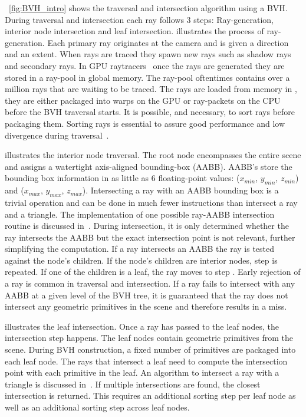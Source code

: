 ~\autoref{fig:BVH_intro} shows the traversal and intersection algorithm using a BVH. During traversal and intersection each ray follows 3 steps:  Ray-generation,  interior node intersection and  leaf intersection. 
 illustrates the process of ray-generation. Each primary ray originates at the camera and is given a direction and an extent. When rays are traced they spawn new rays such as shadow rays and secondary rays. In GPU raytracers~\cite{10.5555/1921479.1921497, 10.1145/3105762.3105773} once the rays are generated they are stored in a ray-pool in global memory. The ray-pool oftentimes contains over a million rays that are waiting to be traced. 
The rays are loaded from memory in , they are either packaged into warps on the GPU or ray-packets on the CPU before the BVH traversal starts. It is possible, and necessary, to sort rays before packaging them. Sorting rays is essential to assure good performance and low divergence during traversal~\cite{article_Garanzha, 10.5555/1921479.1921497}.

 illustrates the interior node traversal. The root node encompasses the entire scene and assigns a watertight axis-aligned bounding-box (AABB). AABB's store the bounding box information in as little as 6 floating-point values: ($x_{min}$, $y_{min}$, $z_{min}$) and ($x_{max}$, $y_{max}$, $z_{max}$). Intersecting a ray with an AABB bounding box is a trivial operation and can be done in much fewer instructions than intersect a ray and a triangle.
The implementation of one possible ray-AABB intersection routine is discussed in~\cite{2005iv}. During intersection, it is only determined whether the ray intersects the AABB but the exact intersection point is not relevant, further simplifying the computation. 
If a ray intersects an AABB the ray is tested against the node's children. If the node's children are interior nodes, step  is repeated. If one of the children is a leaf, the ray moves to step .
Early rejection of a ray is common in traversal and intersection. If a ray fails to intersect with any AABB at a given level of the BVH tree, it is guaranteed that the ray does not intersect any geometric primitives in the scene and therefore results in a miss. 

 illustrates the leaf intersection. Once a ray has passed to the leaf nodes, the intersection step happens. The leaf nodes contain geometric primitives from the scene. During BVH construction, a fixed number of primitives are packaged into each leaf node. The rays that intersect a leaf need to compute the intersection point with each primitive in the leaf. An algorithm to intersect a ray with a triangle is discussed in~\cite{2005iv}. If multiple intersections are found, the closest intersection is returned. This requires an additional sorting step per leaf node as well as an additional sorting step across leaf nodes. 

